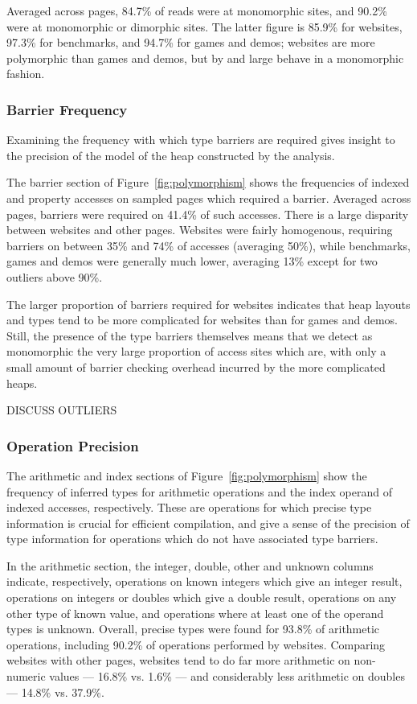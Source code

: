 Averaged across pages, 84.7\% of reads were at monomorphic
sites, and 90.2\% were at monomorphic or dimorphic sites.
The latter figure is 85.9\% for websites, 97.3\% for benchmarks,
and 94.7\% for games and demos; websites are more polymorphic than games
and demos, but by and large behave in a monomorphic fashion.

\subsubsection{Barrier Frequency}
\label{sec:barriers}

Examining the frequency with which type barriers are required
gives insight to the precision of the model of the heap constructed by
the analysis.

The barrier section of Figure~\ref{fig:polymorphism} shows the frequencies of
indexed and property accesses on sampled pages which required a barrier.
Averaged across pages, barriers were required on 41.4\% of such accesses.
There is a large disparity between websites and other pages.
Websites were fairly homogenous, requiring barriers on between 35\%
and 74\% of accesses (averaging 50\%), while benchmarks,
games and demos were generally
much lower, averaging 13\% except for two outliers above 90\%.

The larger proportion of barriers required for websites indicates that
heap layouts and types tend to be more complicated for websites than for
games and demos.
Still, the presence of the type barriers themselves means that we
detect as monomorphic the very large proportion of access sites which are,
with only a small amount of barrier checking overhead incurred by the
more complicated heaps.

DISCUSS OUTLIERS

\subsubsection{Operation Precision}
\label{sec:operations}

The arithmetic and index sections of Figure~\ref{fig:polymorphism} show the frequency
of inferred types for arithmetic operations and the index operand of
indexed accesses, respectively.
These are operations for which precise type information is crucial
for efficient compilation, and give a sense of the precision of type
information for operations which do not have associated type barriers.

In the arithmetic section, the integer, double, other and unknown columns indicate,
respectively,
operations on known integers which give an integer result,
operations on integers or doubles which give a double result,
operations on any other type of known value,
and operations where at least one of the operand types is unknown.
Overall, precise types were found for 93.8\% of arithmetic operations,
including 90.2\% of operations performed by websites.
Comparing websites with other pages, websites tend to do far more
arithmetic on non-numeric values --- 16.8\% vs. 1.6\% ---
and considerably less arithmetic on doubles --- 14.8\% vs. 37.9\%.

